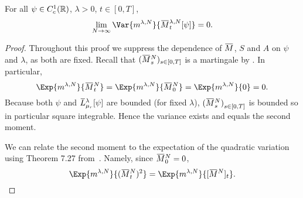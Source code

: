 \begin{proposition}\label{prop:vanishing-variance}  %
  For all \(\psi \in C_c^1(\mathbb{R})\), \(\lambda > 0\), \(t \in [0,T]\),
  \begin{equation}
    \lim_{N\to\infty} \Var{\lawmu^{\lambda,N}}{\ol{M}_t^{\lambda,N}[\psi]} = 0.
  \end{equation}
\end{proposition}
\begin{proof}
  Throughout this proof we suppress the dependence of \( \ol{M} \), \( S \) and \( A \) on \( \psi \) and \( \lambda \), as both are fixed.
  Recall that \((\ol{M}_s^N)_{s\in[0,T]}\) is a martingale by .
  In particular,
  \begin{equation}
    \Exp{\lawmu^{\lambda,N}}{\ol{M}_t^N} = \Exp{\lawmu^{\lambda,N}}{\ol{M}_0^N}
    = \Exp{\lawmu^{\lambda,N}}{0} = 0.    %
  \end{equation}
  Because both \( \psi \) and \( \ol{L}_{\mu_{r}}^\lambda[\psi] \) are bounded (for fixed \( \lambda \)), \({(\ol{M}_s^N)}_{s\in[0,T]}\) is bounded so in particular square integrable.
  Hence the variance exists and equals the second moment.


  We can relate the second moment to the expectation of the quadratic variation using Theorem 7.27 from~\cite[201]{klebanerIntroductionStochasticCalculus2012}.
  Namely, since \(\ol{M}_0^N = 0\),
  \begin{equation}
    \Exp{\lawmu^{\lambda,N}}{(\ol{M}_t^N)^2} = \Exp{\lawmu^{\lambda,N}}{\sbr{\ol{M}^N}_t}.
  \end{equation}


\end{proof}
